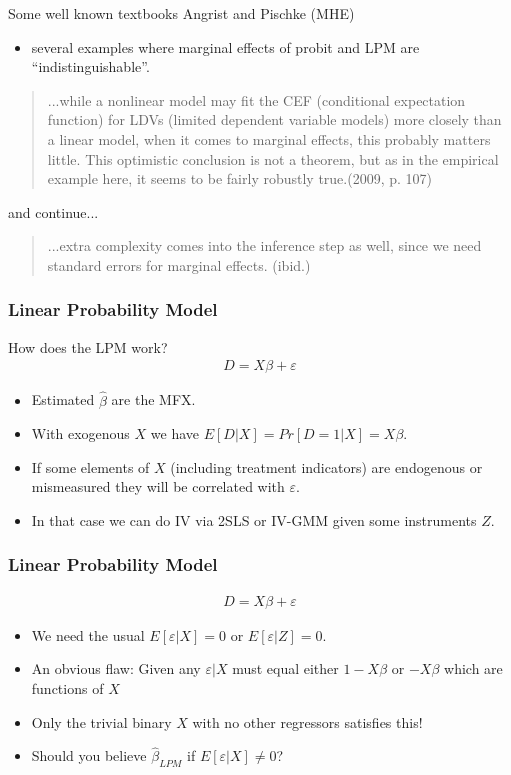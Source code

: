 \documentclass[xcolor=pdftex,dvipsnames,table,mathserif,aspectratio=169]{beamer}
\begin{document}
\begin{frame}{Some well known textbooks}
Angrist and Pischke (MHE) 
\begin{itemize}
\item several examples where marginal effects of probit and LPM are ``indistinguishable''.
\end{itemize}

\begin{quote}
...while a nonlinear model may fit the CEF (conditional expectation function) for LDVs (limited dependent variable models) more closely than a linear model, when it comes to marginal effects, this probably matters little. This optimistic conclusion is not a theorem, but as in the empirical example here, it seems to be fairly robustly true.(2009, p. 107)
\end{quote}
and continue...
\begin{quote}
...extra complexity comes into the inference step as well, since we need standard errors for marginal effects. (ibid.)
\end{quote}
\end{frame}

\begin{frame}
\frametitle{Linear Probability Model}
How does the LPM work?
\begin{eqnarray*}
D = X \beta + \varepsilon
\end{eqnarray*}
\begin{itemize}
\item Estimated $\hat{\beta}$ are the MFX.
\item With exogenous $X$ we have $E[D | X] = Pr[D=1 | X] = X \beta$.
\item If some elements of $X$ (including treatment indicators) are endogenous or mismeasured they will be correlated with $\varepsilon$.
\item In that case we can do IV via 2SLS or IV-GMM given some instruments $Z$.
\end{itemize}
\end{frame}


\begin{frame}
\frametitle{Linear Probability Model}
\begin{eqnarray*}
D = X \beta + \varepsilon
\end{eqnarray*}
\begin{itemize}
\item We need the usual $E[\varepsilon  | X]= 0 $ or $E[\varepsilon | Z] = 0$.
\item An obvious flaw: Given any $\varepsilon | X  $ must equal either $1- X \beta$ or $-X \beta$ which are functions of $X$
\item \alert{Only the trivial binary $X$ with no other regressors satisfies this!}
\item Should you believe $\widehat{\beta}_{LPM}$ if $E[\varepsilon | X ] \neq 0$?
\end{itemize}
\end{frame}
\end{document}
